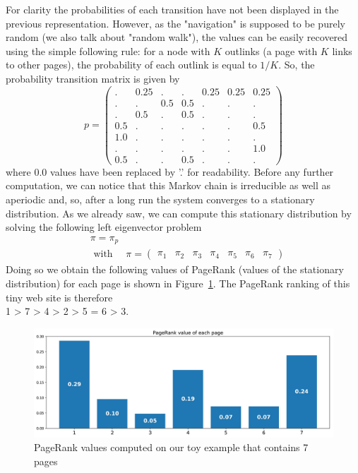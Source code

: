 For clarity the probabilities of each transition have not been displayed in the previous representation. However, as the "navigation" is supposed to be purely random (we also talk about "random walk"), the values can be easily recovered using the simple following rule: for a node with $K$ outlinks (a page with $K$ links to other pages), the probability of each outlink is equal to $1/K$. So, the probability transition matrix is given by
\begin{equation}p=\left(\begin{array}{ccccccc}
. & 0.25 & . & . & 0.25 & 0.25 & 0.25 \\
. & . & 0.5 & 0.5 & . & . & . \\
. & 0.5 & . & 0.5 & . & . & . \\
0.5 & . & . & . & . & . & 0.5 \\
1.0 & . & . & . & . & . & . \\
. & . & . & . & . & . & 1.0 \\
0.5 & . & . & 0.5 & . & . & .
\end{array}\right)\end{equation}
where 0.0 values have been replaced by '.' for readability. Before any further computation, we can notice that this Markov chain is irreducible as well as aperiodic and, so, after a long run the system converges to a stationary distribution. As we already saw, we can compute this stationary distribution by solving the following left eigenvector problem
\begin{equation}\begin{aligned}
&\pi=\pi_p\\
&\text { with } \quad \pi=\left(\begin{array}{lllllll}
\pi_{1} & \pi_{2} & \pi_{3} & \pi_{4} & \pi_{5} & \pi_{6} & \pi_{7}
\end{array}\right)
\end{aligned}\end{equation}
Doing so we obtain the following values of PageRank (values of the stationary distribution) for each page is shown in Figure~\ref{fig:p05c06-snip11}.
The PageRank ranking of this tiny web site is therefore\\
1 > 7 > 4 > 2 > 5 = 6 > 3.

\begin{figure}[h]
    \centering
\includegraphics[width=\textwidth]{pic/p05c06-snip11.png}
    \caption{PageRank values computed on our toy example that contains 7 pages}
    \label{fig:p05c06-snip11}
\end{figure}





